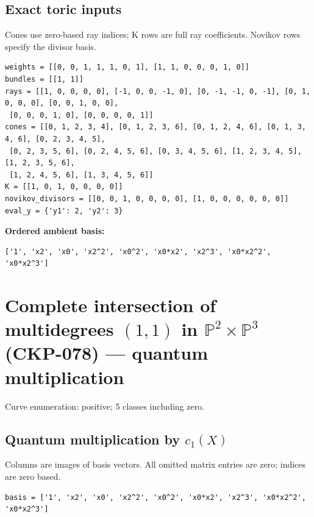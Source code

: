 \documentclass[10pt,a4paper]{article}
\begin{document}
\subsection*{Exact toric inputs}
Cones use zero-based ray indices; K rows are full ray coefficients. Novikov rows specify the divisor basis.

\begin{lstlisting}
weights = [[0, 0, 1, 1, 1, 0, 1], [1, 1, 0, 0, 0, 1, 0]]
bundles = [[1, 1]]
rays = [[1, 0, 0, 0, 0], [-1, 0, 0, -1, 0], [0, -1, -1, 0, -1], [0, 1, 0, 0, 0], [0, 0, 1, 0, 0],
 [0, 0, 0, 1, 0], [0, 0, 0, 0, 1]]
cones = [[0, 1, 2, 3, 4], [0, 1, 2, 3, 6], [0, 1, 2, 4, 6], [0, 1, 3, 4, 6], [0, 2, 3, 4, 5],
 [0, 2, 3, 5, 6], [0, 2, 4, 5, 6], [0, 3, 4, 5, 6], [1, 2, 3, 4, 5], [1, 2, 3, 5, 6],
 [1, 2, 4, 5, 6], [1, 3, 4, 5, 6]]
K = [[1, 0, 1, 0, 0, 0, 0]]
novikov_divisors = [[0, 0, 1, 0, 0, 0, 0], [1, 0, 0, 0, 0, 0, 0]]
eval_y = {'y1': 2, 'y2': 3}
\end{lstlisting}

\textbf{Ordered ambient basis:}
\begin{lstlisting}
['1', 'x2', 'x0', 'x2^2', 'x0^2', 'x0*x2', 'x2^3', 'x0*x2^2', 'x0*x2^3']
\end{lstlisting}

\clearpage\section*{Complete intersection of multidegrees $(1,1)$ in $\mathbb P^{2}\times \mathbb P^{3}$ (CKP-078) --- quantum multiplication}

Curve enumeration: positive; 5 classes including zero.
\subsection*{Quantum multiplication by $c_1(X)$}
Columns are images of basis vectors. All omitted matrix entries are zero; indices are zero based.

\begin{lstlisting}
basis = ['1', 'x2', 'x0', 'x2^2', 'x0^2', 'x0*x2', 'x2^3', 'x0*x2^2', 'x0*x2^3']
\end{lstlisting}
\end{document}
